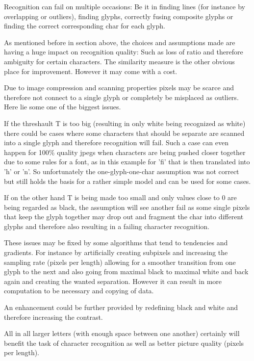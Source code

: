 \documentclass[12pt]{scrartcl}
\begin{document}
Recognition can fail on multiple occasions: Be it in finding lines (for instance by overlapping or outliers), finding glyphs, correctly fusing composite glyphs or finding the correct corresponding char for each glyph.

As mentioned before in section above, the choices and assumptions made are having a huge impact on recognition quality: Such as loss of ratio and therefore ambiguity for certain characters. The similarity measure is the other obvious place for improvement. However it may come with a cost.

Due to image compression and scanning properties pixels may be scarce and therefore not connect to a single glyph or completely be misplaced as outliers. Here lie some one of the biggest issues. 

If the threshault T is too big (resulting in only white being recognized as white) there could be cases where some characters that should be separate are scanned into a single glyph and therefore recognition will fail.\newline
Such a case can even happen for 100\% quality jpegs when characters are being pushed closer together due to some rules for a font, as in this example for 'fi' that is then translated into 'h' or 'n'. So unfortunately the one-glyph-one-char assumption was not correct but still holds the basis for a rather simple model and can be used for some cases.

If on the other hand T is being made too small and only values close to 0 are being regarded as black, the assumption will see another fail as some single pixels that keep the glyph together may drop out and fragment the char into different glyphs and therefore also resulting in a failing character recognition.

These issues may be fixed by some algorithms that tend to tendencies and gradients. For instance by artificially creating subpixels and increasing the sampling rate (pixels per length) allowing for a smoother transition from one glyph to the next and also going from maximal black to maximal white and back again and creating the wanted separation. However it can result in more computation to be necessary and copying of data.

An enhancement could be further provided by redefining black and white and therefore increasing the contrast.

All in all larger letters (with enough space between one another) certainly will benefit the task of character recognition as well as better picture quality (pixels per length).
\end{document}
